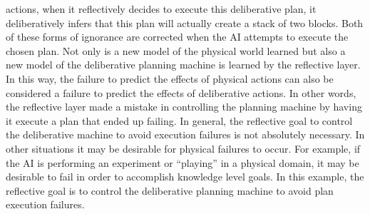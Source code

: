 actions, when it reflectively decides to execute this deliberative
plan, it deliberatively infers that this plan will actually create a
stack of two blocks.  Both of these forms of ignorance are corrected
when the AI attempts to execute the chosen plan.  Not only is a new
model of the physical world learned but also a new model of the
deliberative planning machine is learned by the reflective layer.  In
this way, the failure to predict the effects of physical actions can
also be considered a failure to predict the effects of deliberative
actions.  In other words, the reflective layer made a mistake in
controlling the planning machine by having it execute a plan that
ended up failing.  In general, the reflective goal to control the
deliberative machine to avoid execution failures is not absolutely
necessary.  In other situations it may be desirable for physical
failures to occur.  For example, if the AI is performing an experiment
or ``playing'' in a physical domain, it may be desirable to fail in
order to accomplish knowledge level goals.  In this example, the
reflective goal is to control the deliberative planning machine to
avoid plan execution failures.
